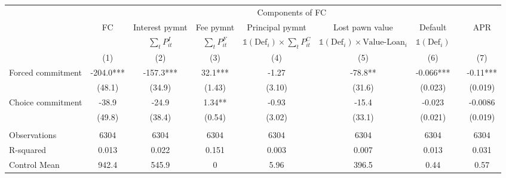 \begin{tabular}{lcccccccc}
\toprule
      &       & \multicolumn{5}{c}{Components of FC}  &       &  \\
\cmidrule{3-7}      & FC    & Interest pymnt & Fee pymnt & Principal pymnt & Lost pawn value & Default &       & APR \\
\cmidrule{2-2}\cmidrule{9-9}      &       & $\sum_t P^I_{it}$ & $\sum_t P^F_{it}$ & $\mathds{1}(\text{Def}_i)\times\sum_t P^C_{it}$ & $\mathds{1}(\text{Def}_i)\times \text{Value-Loan}_i$ & $\mathds{1}(\text{Def}_i)$ &       &  \\
\midrule
      & (1)   & (2)   & (3)   & (4)   & (5)   & (6)   &       & (7) \\
\midrule
\midrule
Forced commitment & -204.0*** & -157.3*** & 32.1*** & -1.27 & -78.8** & -0.066*** &       & -0.11*** \\
      & (48.1) & (34.9) & (1.43) & (3.10) & (31.6) & (0.023) &       & (0.019) \\
Choice commitment & -38.9 & -24.9 & 1.34** & -0.93 & -15.4 & -0.023 &       & -0.0086 \\
      & (49.8) & (38.4) & (0.54) & (3.02) & (33.1) & (0.021) &       & (0.019) \\
      &       &       &       &       &       &       &       &  \\
\midrule
Observations & 6304  & 6304  & 6304  & 6304  & 6304  & 6304  &       & 6304 \\
R-squared & 0.013 & 0.022 & 0.151 & 0.003 & 0.007 & 0.013 &       & 0.031 \\
Control Mean & 942.4 & 545.9 & 0     & 5.96  & 396.5 & 0.44  &       & 0.57 \\
\bottomrule
\bottomrule
\end{tabular}%
